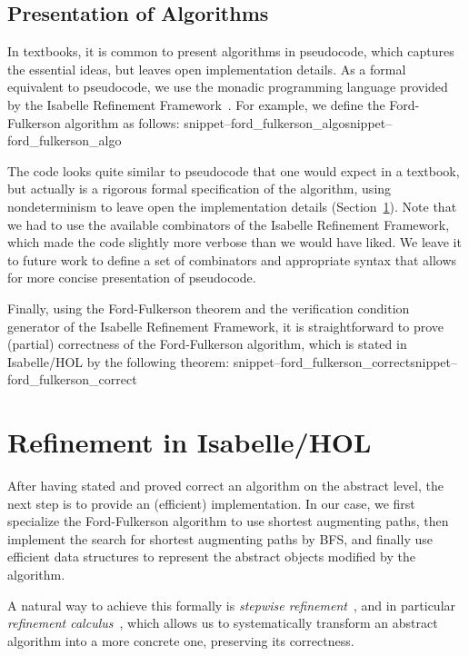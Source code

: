 \documentclass[smallcondensed]{svjour3}     %
\newcommand{\Snippet}[1]{\ifcsname snippet--#1\endcsname\csname snippet--#1\endcsname\else\PackageError{}{No snippet '#1' defined.}{}\fi}
\begin{document}
\subsection{Presentation of Algorithms}
In textbooks, it is common to present algorithms in pseudocode, which captures the essential ideas, but leaves open implementation details. As a formal equivalent to pseudocode, we use the monadic programming language provided by the Isabelle Refinement Framework~\cite{LaTu12,La12}. For example, we define the Ford-Fulkerson algorithm as follows:
\Snippet{ford_fulkerson_algo}

The code looks quite similar to pseudocode that one would expect in a textbook, but actually is a rigorous formal specification of the algorithm, using nondeterminism to leave open the implementation details (\cf Section~\ref{sec:refinement}). Note that we had to use the available combinators of the Isabelle Refinement Framework, which made the code slightly more verbose than we would have liked. We leave it to future work to define a set of combinators and appropriate syntax that allows for more concise presentation of pseudocode.


Finally, using the Ford-Fulkerson theorem and the verification condition generator of the Isabelle Refinement Framework, it is straightforward to prove (partial) correctness of
the Ford-Fulkerson algorithm, which is stated in Isabelle/HOL by the following theorem:
\Snippet{ford_fulkerson_correct}

\section{Refinement in Isabelle/HOL}\label{sec:refinement}
After having stated and proved correct an algorithm on the abstract level, the next step is to provide an (efficient) implementation. 
In our case, we first specialize the Ford-Fulkerson algorithm to use shortest augmenting paths, then implement the search for shortest augmenting paths by BFS, and finally use efficient data structures to represent the abstract objects modified by the algorithm. 

A natural way to achieve this formally is \emph{stepwise refinement}~\cite{Wirth71}, and in particular \emph{refinement calculus}~\cite{Back78,BaWr98}, which allows us to systematically transform an abstract algorithm into a more concrete one, preserving its correctness.
\end{document}
